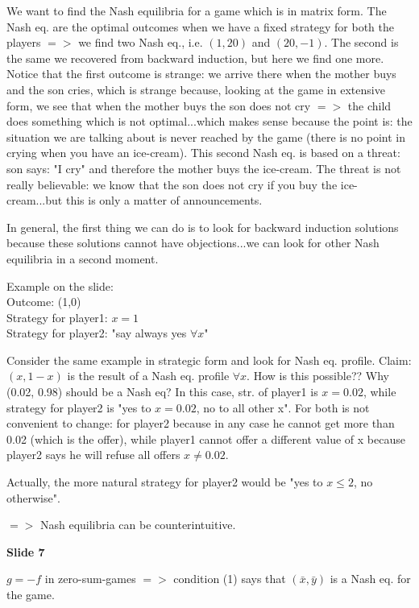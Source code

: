\noindent We want to find the Nash equilibria for a game which is in 
matrix form. The Nash eq. are the optimal outcomes when we have a fixed 
strategy for both the players $=>$ we find two Nash eq., i.e. $(1,20)$ 
and $(20,-1)$. The second is the same we recovered from backward 
induction, but here we find one more. Notice that the first outcome is 
strange: we arrive there when the mother buys and the son cries, which 
is strange because, looking at the game in extensive form, we see that 
when the mother buys the son does not cry $=>$ the child does something 
which is not optimal...which makes sense because the point is: the 
situation we are talking about is never reached by the game (there is 
no point in crying when you have an ice-cream). This second Nash eq. is 
based on a threat: son says: "I cry" and therefore the mother buys the 
ice-cream. The threat is not really believable: we know that the son 
does not cry if you buy the ice-cream...but this is only a matter of 
announcements.

\noindent In general, the first thing we can do is to look for backward 
induction solutions because these solutions cannot have objections...we 
can look for other Nash equilibria in a second moment.

\noindent Example on the slide:\\
Outcome: (1,0)\\
Strategy for player1: $x=1$\\
Strategy for player2: "say always yes $\forall x$"

\noindent Consider the same example in strategic form and look for Nash 
eq. profile. Claim: $(x,1-x)$ is the result of a Nash eq. profile 
$\forall x$. How is this possible?? Why (0.02, 0.98) should be a Nash eq? 
In this case, str. of player1 is $x=0.02$, while strategy for player2 is 
"yes to $x=0.02$, no to all other x". For both is not convenient to change: 
for player2 because in any case he cannot get more than 0.02 (which is 
the offer), while player1 cannot offer a different value of x because 
player2 says he will refuse all offers $x\neq 0.02$.

\noindent Actually, the more natural strategy for player2 would be 
"yes to $x \leq 2$, no otherwise".

\noindent $=>$ Nash equilibria can be counterintuitive.

\bigskip
\noindent \textbf{Slide 7}

\noindent $g=-f$ in zero-sum-games $=>$ condition (1) says that 
$(\bar{x},\bar{y})$ is a Nash eq. for the game.

